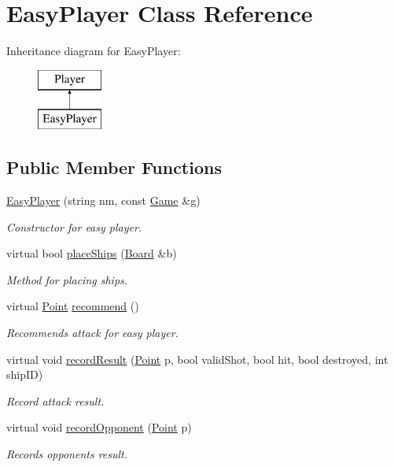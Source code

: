 \hypertarget{class_easy_player}{}\section{Easy\+Player Class Reference}
\label{class_easy_player}
Inheritance diagram for Easy\+Player\+:\begin{figure}[H]
\begin{center}
\leavevmode
\includegraphics[height=2.000000cm]{class_easy_player}
\end{center}
\end{figure}
\subsection*{Public Member Functions}
\begin{DoxyCompactItemize}
\item 
\mbox{\hyperlink{class_easy_player_a6ab4cbdc4e8e353e0dbecb9c2c4e3f7c}{Easy\+Player}} (string nm, const \mbox{\hyperlink{class_game}{Game}} \&g)
\begin{DoxyCompactList}\small\item\em Constructor for easy player. \end{DoxyCompactList}\item 
virtual bool \mbox{\hyperlink{class_easy_player_a4b9d5815113f393615412f7a98176a6c}{place\+Ships}} (\mbox{\hyperlink{class_board}{Board}} \&b)
\begin{DoxyCompactList}\small\item\em Method for placing ships. \end{DoxyCompactList}\item 
virtual \mbox{\hyperlink{class_point}{Point}} \mbox{\hyperlink{class_easy_player_a9b00f4a9acc74ff688c609bc15bdbb4d}{recommend}} ()
\begin{DoxyCompactList}\small\item\em Recommends attack for easy player. \end{DoxyCompactList}\item 
virtual void \mbox{\hyperlink{class_easy_player_a254a5ddcd421e1dc71e45125e7ab04d8}{record\+Result}} (\mbox{\hyperlink{class_point}{Point}} p, bool valid\+Shot, bool hit, bool destroyed, int ship\+ID)
\begin{DoxyCompactList}\small\item\em Record attack result. \end{DoxyCompactList}\item 
virtual void \mbox{\hyperlink{class_easy_player_a2121149ace67b4a67a5dfa7633738ea3}{record\+Opponent}} (\mbox{\hyperlink{class_point}{Point}} p)
\begin{DoxyCompactList}\small\item\em Records opponent\textquotesingle{}s result. \end{DoxyCompactList}\end{DoxyCompactItemize}


